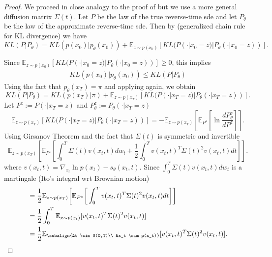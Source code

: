    
\begin{proof}   
    We proceed in close analogy to the proof of \cite[Theorem 1]{song2021maximum} but we use a more general diffusion matrix $\Sigma(t)$. 
    Let $P$ be the law of the true reverse-time sde and let $P_\theta$ be the law of the approximate reverse-time sde. 
    Then by  \cite[Theorem 2.4]{leonard2013properties} (generalized chain rule for KL divergence) we have
    \begin{equation}
        KL(P | P_\theta) = KL(p(x_0) | p_\theta(x_0)) + \mathbb{E}_{z \sim p(x_0)}[KL(P(\cdot | x_0=z) |P_\theta(\cdot | x_0=z))].
    \end{equation}
    
    Since $\mathbb{E}_{z \sim p(x_0)}[KL(P(\cdot | x_0=z) |P_\theta(\cdot | x_0=z))] \geq 0$, this implies 
    \begin{align*}
       KL(p(x_0) | p_\theta(x_0)) \leq KL(P | P_\theta) 
    \end{align*}
    Using the fact that $p_\theta(x_T) = \pi$ and applying \cite[Theorem 2.4]{leonard2013properties} again, we obtain
    \begin{equation}
        KL(P | P_\theta) = KL(p(x_T) |\pi) + \mathbb{E}_{z \sim p(x_T)}[KL(P(\cdot | x_T=z) |P_\theta(\cdot | x_T=z))].
    \end{equation}    
    Let $P^z := P(\cdot | x_T=z)$ and $P_\theta^z := P_\theta(\cdot | x_T=z)$
    \begin{equation}
        \mathbb{E}_{z \sim p(x_T)}[KL(P(\cdot | x_T=z) |P_\theta(\cdot | x_T=z))] = - \mathbb{E}_{z \sim p(x_T)} \left[ \mathbb{E}_{P^z} \left[ \ln \frac{d P^z_\theta}{d P^z} \right] \right].
    \end{equation}    
    Using Girsanov Theorem \cite[Theorem 8.6.5]{oksendal2003sde} and the fact that $\Sigma(t)$ is symmetric and invertible 
    \begin{equation}
        \mathbb{E}_{z \sim p(x_T)} \left[ \mathbb{E}_{P^z} \left[ \int_0^T \Sigma(t) v(x_t,t) dw_t + \frac{1}{2} \int_0^T v(x_t,t)^T \Sigma(t)^2 v(x_t,t) dt \right] \right].
    \end{equation}    
    where $v(x_t,t)=\nabla_{x_t} \ln{p(x_t)} - s_\theta(x_t,t)$. Since $\int_0^T  \Sigma(t) v(x_t,t) dw_t $ is a martingale (Ito's integral wrt Brownian motion) 
    \begin{align*}
        &=  \frac{1}{2} \mathbb{E}_{z \sim p(x_T)}  \bigg[ 
            \mathbb{E}_{P^z} \bigg[
                     \int_0^T v(x_t,t)^T \Sigma(t)^2 v(x_t,t) dt 
            \bigg]
        \bigg] \\
        &= \frac{1}{2} \int_0^T \mathbb{E}_{x \sim p(x_t)}[ v(x_t,t)^T \Sigma(t)^2 v(x_t,t)] \\
        &= \frac{1}{2} \mathbb{E}_{\subalign{&t \sim U(0,T)\\ &x_t \sim p(x_t)}} 
        [
            v(x_t,t)^T \Sigma(t)^2 v(x_t,t)
        ].
    \end{align*}
\end{proof}

